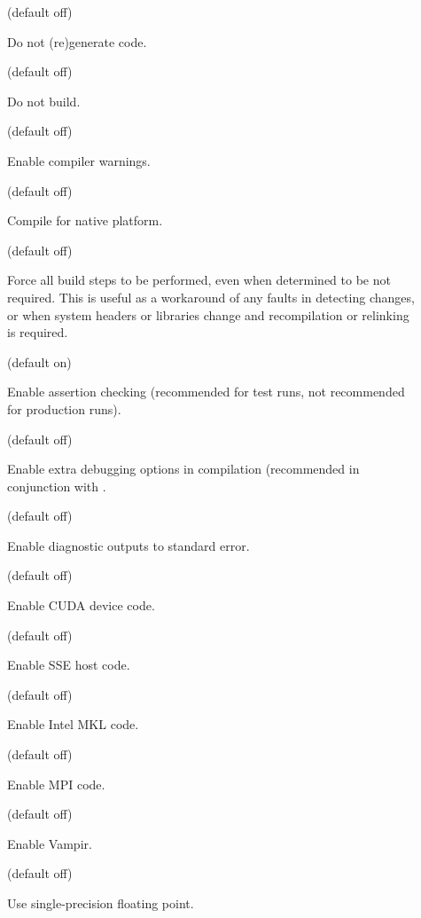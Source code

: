 \begin{description}
\item[] (default off)

Do not (re)generate code.

\item[] (default off)

Do not build.

\item[] (default off)

Enable compiler warnings.

\item[] (default off)

Compile for native platform.

\item[] (default off)

Force all build steps to be performed, even when determined to be not
required. This is useful as a workaround of any faults in detecting
changes, or when system headers or libraries change and recompilation or
relinking is required.

\item[] (default on)

Enable assertion checking (recommended for test runs, not recommended for
production runs).

\item[] (default off)

Enable extra debugging options in compilation (recommended in conjunction with
.

\item[] (default off)

Enable diagnostic outputs to standard error.

\item[] (default off)

Enable CUDA device code.

\item[] (default off)

Enable SSE host code.

\item[] (default off)

Enable Intel MKL code.

\item[] (default off)

Enable MPI code.

\item[] (default off)

Enable Vampir.

\item[] (default off)

Use single-precision floating point.
\end{description}

